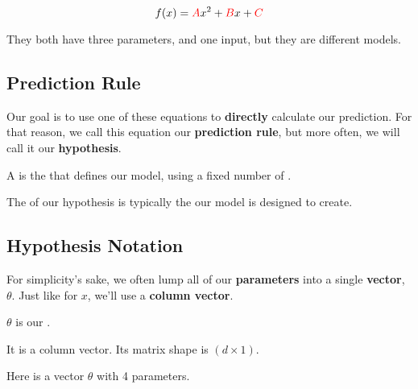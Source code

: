         \begin{equation}
            f(x) = \textcolor{red}{A}x^2 + \textcolor{red}{B}x + \textcolor{red}{C}
        \end{equation}
        
        They both have three parameters, and one input, but they are different models.
        
    
    \subsection{Prediction Rule}
    
        Our goal is to use one of these equations to \textbf{directly} calculate our prediction. For that reason, we call this equation our \textbf{prediction rule}, but more often, we will call it our \textbf{hypothesis}.\\
        
        \begin{definition}
            A  is the  that defines our model, using a fixed number of .
            
            The  of our hypothesis is typically the  our model is designed to create.
        \end{definition}
        
    \subsection{Hypothesis Notation}
        
        For simplicity's sake, we often lump all of our \textbf{parameters} into a single \textbf{vector}, $\theta$. Just like for $x$, we'll use a \textbf{column vector}.\\
        
        \begin{notation}
            $\theta$ is our . 
            
            It is a column vector. Its matrix shape is $(d \times 1)$.
        \end{notation}
        
        
        \miniex Here is a vector $\theta$ with 4 parameters.
        
